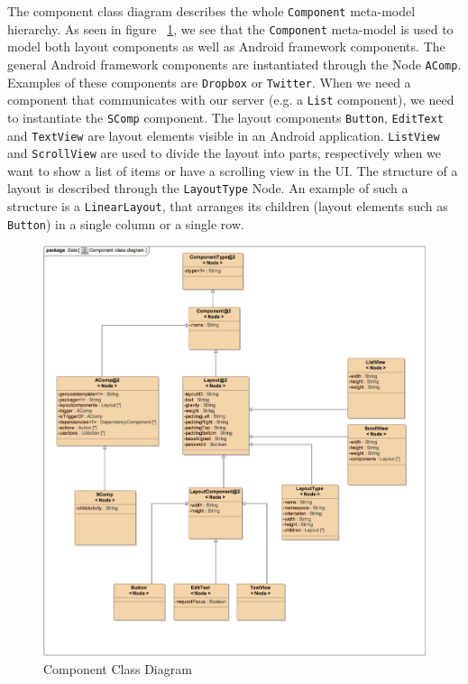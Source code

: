 The component class diagram describes the whole \texttt{Component} meta-model hierarchy. As seen in figure ~\ref{fig:component_megamodel}, we see that the \texttt{Component} meta-model is used to model both layout components as well as Android framework components. The general Android framework components are instantiated through the Node \texttt{AComp}. Examples of these components are \texttt{Dropbox} or \texttt{Twitter}. When we need a component that communicates with our server (e.g. a \texttt{List} component), we need to instantiate the \texttt{SComp} component. The layout components \texttt{Button}, \texttt{EditText} and \texttt{TextView} are layout elements visible in an Android application. \texttt{ListView} and \texttt{ScrollView} are used to divide the layout into parts, respectively when we want to show a list of items or have a scrolling view in the UI. The structure of a layout is described through the \texttt{LayoutType} Node. An example of such a structure is a \texttt{LinearLayout}, that arranges its children (layout elements such as \texttt{Button}) in a single column or a single row.
\begin{figure}[h!]
\centering
\includegraphics[width=1.0\textwidth]{images/chap6_component_megam.png}
\caption{Component Class Diagram}
\label{fig:component_megamodel}
\end{figure}

